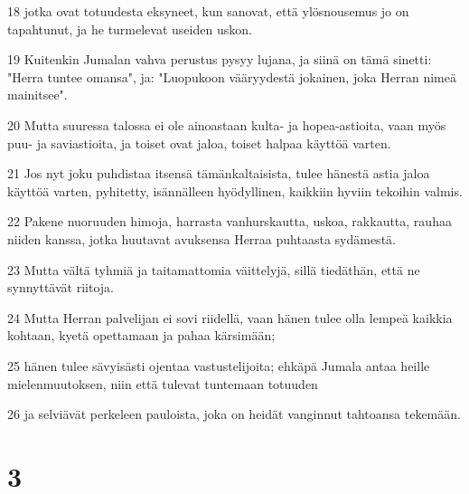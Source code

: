 \par 18 jotka ovat totuudesta eksyneet, kun sanovat, että ylösnousemus jo on tapahtunut, ja he turmelevat useiden uskon.
\par 19 Kuitenkin Jumalan vahva perustus pysyy lujana, ja siinä on tämä sinetti: "Herra tuntee omansa", ja: "Luopukoon vääryydestä jokainen, joka Herran nimeä mainitsee".
\par 20 Mutta suuressa talossa ei ole ainoastaan kulta- ja hopea-astioita, vaan myös puu- ja saviastioita, ja toiset ovat jaloa, toiset halpaa käyttöä varten.
\par 21 Jos nyt joku puhdistaa itsensä tämänkaltaisista, tulee hänestä astia jaloa käyttöä varten, pyhitetty, isännälleen hyödyllinen, kaikkiin hyviin tekoihin valmis.
\par 22 Pakene nuoruuden himoja, harrasta vanhurskautta, uskoa, rakkautta, rauhaa niiden kanssa, jotka huutavat avuksensa Herraa puhtaasta sydämestä.
\par 23 Mutta vältä tyhmiä ja taitamattomia väittelyjä, sillä tiedäthän, että ne synnyttävät riitoja.
\par 24 Mutta Herran palvelijan ei sovi riidellä, vaan hänen tulee olla lempeä kaikkia kohtaan, kyetä opettamaan ja pahaa kärsimään;
\par 25 hänen tulee sävyisästi ojentaa vastustelijoita; ehkäpä Jumala antaa heille mielenmuutoksen, niin että tulevat tuntemaan totuuden
\par 26 ja selviävät perkeleen pauloista, joka on heidät vanginnut tahtoansa tekemään.

\chapter{3}

